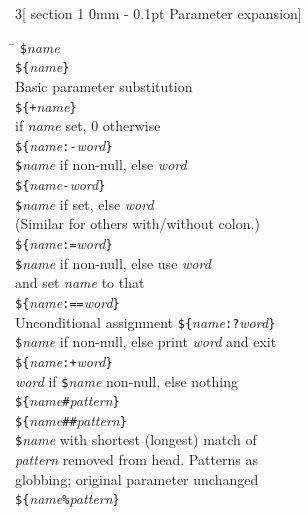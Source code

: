 \documentclass{article}
\makeatletter
\renewcommand{\section}{\@startsection
  {section}%
  {1}%
  {0mm}%
  {-\baselineskip}%
  {0.1pt}%
  {\normalfont\normalsize\scshape}} %
\newcommand\I[1]{\textsl{#1}}
\makeatother
\begin{document}
\begin{multicols}{3}[\section{Parameter expansion}]

\begin{tabbing}
\hskip 20pt \= \kill
\verb!$!\I{name} \\
\verb!${!\I{name}\verb!}! \\
                \> Basic parameter substitution \\
\verb!${+!\I{name}\verb!}! \\
                 if \I{name} set, 0 otherwise \\
\verb!${!\I{name}\verb!:-!\I{word}\verb!}! \\
                \> \verb!$!\I{name} if non-null, else \I{word} \\
\verb!${!\I{name}\verb!-!\I{word}\verb!}! \\
                \> \verb!$!\I{name} if set, else \I{word} \\
                \> (Similar for others with/without colon.) \\
\verb!${!\I{name}\verb!:=!\I{word}\verb!}! \\
                \> \verb!$!\I{name} if non-null, else use \I{word} \\
                \> and set \I{name} to that \\
\verb!${!\I{name}\verb!:==!\I{word}\verb!}! \\
                \> Unconditional assignment
\verb!${!\I{name}\verb!:?!\I{word}\verb!}! \\
                \> \verb!$!\I{name} if non-null, else print \I{word}
                and exit \\
\verb!${!\I{name}\verb!:+!\I{word}\verb!}! \\
                \> \I{word} if \verb!$!\I{name} non-null, else nothing \\
\verb!${!\I{name}\verb!#!\I{pattern}\verb!}! \\
\verb!${!\I{name}\verb!##!\I{pattern}\verb!}! \\
                \> \verb!$!\I{name} with shortest (longest)
                match of \\
                \> \I{pattern} removed from head. Patterns as \\
                \> globbing; original parameter unchanged \\
\verb!${!\I{name}\verb!%!\I{pattern}\verb!}! \\

\end{tabbing}
\end{multicols}
\end{document}
